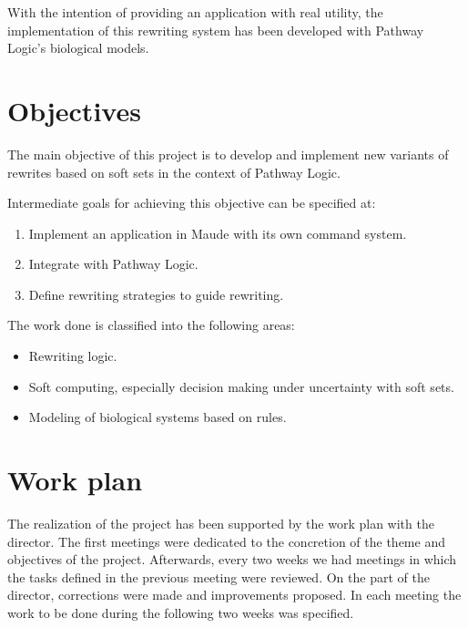 With the intention of providing an application with real utility, the implementation of this rewriting system has been developed with Pathway Logic's biological models.



\section{Objectives}

The main objective of this project is to develop and implement new variants of rewrites based on soft sets in the context of Pathway Logic.
\smallskip

Intermediate goals for achieving this objective can be specified at:
\begin{enumerate}
\item Implement an application in Maude with its own command system.
\item Integrate with Pathway Logic.
\item Define rewriting strategies to guide rewriting.
\end{enumerate}

The work done is classified into the following areas:
\begin{itemize}
\item Rewriting logic.
\item Soft computing, especially decision making under uncertainty with soft sets.
\item Modeling of biological systems based on rules.
\end{itemize}


\section{Work plan}

The realization of the project has been supported by the work plan with the director.
%
The first meetings were dedicated to the concretion of the theme and objectives of the project.
Afterwards, every two weeks we had meetings in which the tasks defined in the previous meeting were reviewed.
On the part of the director, corrections were made and improvements proposed.
In each meeting the work to be done during the following two weeks was specified.

